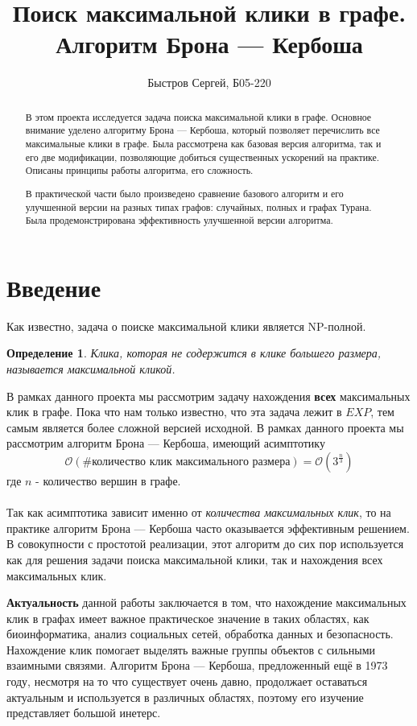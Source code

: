 \documentclass{article}
\title{Поиск максимальной клики в графе.\\Алгоритм Брона — Кербоша}
\author{Быстров Сергей, Б05-220}
\date{}
\newtheorem{theorem}{Определение}
\begin{document}
\maketitle

\begin{abstract}
В этом проекта исследуется задача поиска максимальной клики в графе. Основное внимание уделено алгоритму Брона — Кербоша, который позволяет перечислить все максимальные клики в графе. Была рассмотрена как базовая версия алгоритма, так и его две модификации, позволяющие добиться существенных ускорений на практике. Описаны принципы работы алгоритма, его сложность.

В практической части было произведено сравнение базового алгоритм и его улучшенной версии на разных типах графов: случайных, полных и графах Турана. Была продемонстрирована эффективность улучшенной версии алгоритма. 

\end{abstract}
\newpage

\tableofcontents

\newpage
\section{Введение}
Как известно, задача о поиске максимальной клики является NP-полной.
\begin{theorem}
Клика, которая не содержится в клике большего
размера, называется максимальной кликой.
\end{theorem}
В рамках данного проекта мы рассмотрим задачу нахождения \textbf{всех} максимальных клик в графе. Пока что нам только известно, что эта задача лежит в $EXP$, тем самым является более сложной версией исходной. В рамках данного проекта мы рассмотрим алгоритм Брона — Кербоша, имеющий асимптотику $$\mathcal{O}(\#\text{количество клик максимального размера})=\mathcal{O}(3^\frac{n}{3})$$
где $n$ - количество вершин в графе.\\\\
Так как асимптотика зависит именно от \textit{количества максимальных клик}, то на практике алгоритм Брона — Кербоша часто оказывается эффективным решением. В совокупности с простотой реализации, этот алгоритм до сих пор используется как для решения задачи поиска максимальной клики, так и нахождения всех максимальных клик.

\textbf{Актуальность} данной работы заключается в том, что нахождение максимальных клик в графах имеет важное практическое значение в таких областях, как биоинформатика, анализ социальных сетей, обработка данных и безопасность. Нахождение клик помогает выделять важные группы объектов с сильными взаимными связями. Алгоритм Брона — Кербоша, предложенный ещё в 1973 году, несмотря на то что существует очень давно, продолжает оставаться актуальным и используется в различных областях, поэтому его изучение представляет большой инетерс.
\end{document}
